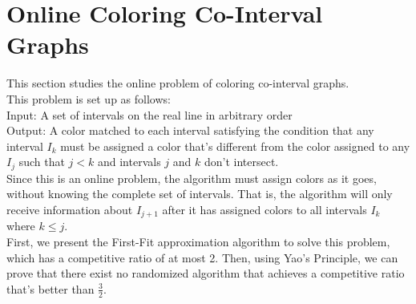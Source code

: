 \section{Online Coloring Co-Interval Graphs}
This section studies the online problem of coloring co-interval graphs. \\This problem is set up as follows:
\\Input: A set of intervals on the real line in arbitrary order
\\Output: A color matched to each interval satisfying the condition that any interval $I_k$ must be assigned a color that's different from the color assigned to any $I_j$ such that $j < k$ and intervals $j$ and $k$ don't intersect.
\\Since this is an online problem, the algorithm must assign colors as it goes, without knowing the complete set of intervals. That is, the algorithm will only receive information about $I_{j+1}$ after it has assigned colors to all intervals $I_k$ where $k \leq j$.
\\First, we present the First-Fit approximation algorithm to solve this problem, which has a competitive ratio of at most 2. Then, using Yao's Principle, we can prove that there exist no randomized algorithm that achieves a competitive ratio that's better than $\frac{3}{2}$.
